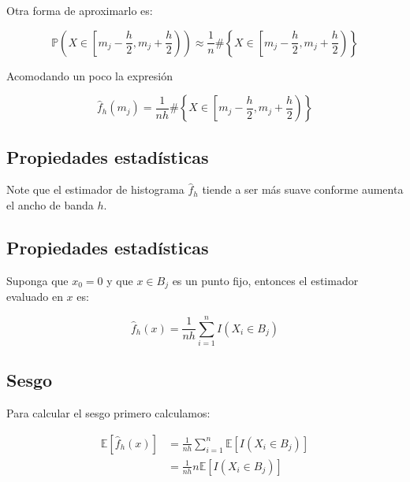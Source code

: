 \documentclass[
  12pt,
]{book}
\theoremstyle{definition}
\theoremstyle{definition}
\theoremstyle{definition}
\theoremstyle{definition}
\theoremstyle{remark}
\begin{document}
Otra forma de aproximarlo es:

\begin{equation*}
    \mathbb{P} \left(X\in \left[m_j - \frac{h}{2},m_j + \frac{h}{2}\right) \right)  \approx   \frac{1}{n} \#
    \left\{X\in \left[m_j - \frac{h}{2},m_j + \frac{h}{2}\right) \right\}
\end{equation*}

Acomodando un poco la expresión

\begin{equation*}
\hat{f}_h(m_j) =  \frac{1}{nh} \#
\left\{X\in \left[m_j - \frac{h}{2},m_j + \frac{h}{2}\right) \right\}
\end{equation*}

\hypertarget{propiedades-estaduxedsticas}{%
\subsection{Propiedades estadísticas}\label{propiedades-estaduxedsticas}}

Note que el estimador de histograma \(\hat f_h\) tiende a ser más suave conforme aumenta el ancho de banda \(h\).

\hypertarget{propiedades-estaduxedsticas-1}{%
\subsection{Propiedades estadísticas}\label{propiedades-estaduxedsticas-1}}

Suponga que \(x_0 = 0\) y que \(x \in B_j\) es un punto fijo, entonces el estimador evaluado en \(x\) es:

\begin{equation*}
\hat{f}_h(x) =  \frac{1}{nh} \sum_{i = 1}^{n} I(X_i \in B_j)
\end{equation*}

\hypertarget{sesgo}{%
\subsection{Sesgo}\label{sesgo}}

Para calcular el sesgo primero calculamos:

\begin{align*}
\mathbb{E}\left[ \hat{f}_h(x)\right]
& =  \frac{1}{nh} \sum_{i = 1}^{n} \mathbb{E}\left[ I(X_i \in B_j)\right] \\
& = \frac{1}{nh} n \mathbb{E}\left[ I(X_i \in B_j)\right]
\end{align*}
\end{document}
